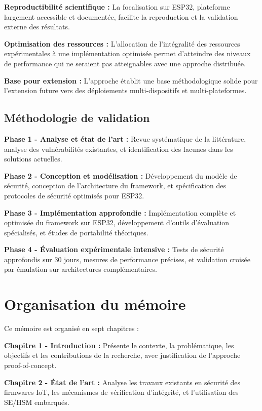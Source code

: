 \textbf{Reproductibilité scientifique :} La focalisation sur ESP32, plateforme largement accessible et documentée, facilite la reproduction et la validation externe des résultats.

\textbf{Optimisation des ressources :} L'allocation de l'intégralité des ressources expérimentales à une implémentation optimisée permet d'atteindre des niveaux de performance qui ne seraient pas atteignables avec une approche distribuée.

\textbf{Base pour extension :} L'approche établit une base méthodologique solide pour l'extension future vers des déploiements multi-dispositifs et multi-plateformes.

\subsection{Méthodologie de validation}

\textbf{Phase 1 - Analyse et état de l'art :} Revue systématique de la littérature, analyse des vulnérabilités existantes, et identification des lacunes dans les solutions actuelles.

\textbf{Phase 2 - Conception et modélisation :} Développement du modèle de sécurité, conception de l'architecture du framework, et spécification des protocoles de sécurité optimisés pour ESP32.

\textbf{Phase 3 - Implémentation approfondie :} Implémentation complète et optimisée du framework sur ESP32, développement d'outils d'évaluation spécialisés, et études de portabilité théoriques.

\textbf{Phase 4 - Évaluation expérimentale intensive :} Tests de sécurité approfondis sur 30 jours, mesures de performance précises, et validation croisée par émulation sur architectures complémentaires.

\section{Organisation du mémoire}

Ce mémoire est organisé en sept chapitres :

\textbf{Chapitre 1 - Introduction :} Présente le contexte, la problématique, les objectifs et les contributions de la recherche, avec justification de l'approche proof-of-concept.

\textbf{Chapitre 2 - État de l'art :} Analyse les travaux existants en sécurité des firmwares IoT, les mécanismes de vérification d'intégrité, et l'utilisation des \ac{SE}/\ac{HSM} embarqués.

